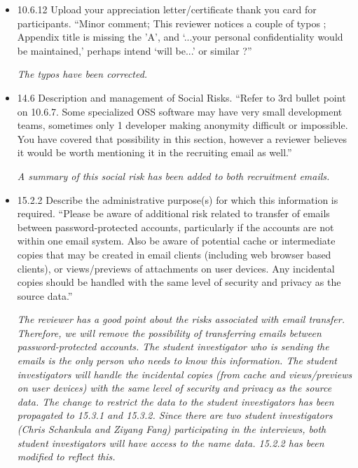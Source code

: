 \documentclass[12pt]{casletter}
\begin{document}
\begin{letter}
\begin{itemize}
\begin{itemize}
\emph{The statement about social risks has been added to both recruitment
emails.} \smallskip

\item Much like you have written in the oral consent script, please include a
statement like `I located your name/email by visiting the website of {research
software name}.' \smallskip

\emph{This statement has been added to both recruitment emails.} \smallskip

\end{itemize} \medskip

\item 10.6.12 Upload your appreciation letter/certificate thank you card for
participants.  ``Minor comment; This reviewer notices a couple of typos ;
Appendix title is missing the 'A', and `...your personal confidentiality would
be maintained,' perhaps intend `will be...' or similar ?'' \medskip

\emph{The typos have been corrected.} \smallskip

\item 14.6 Description and management of Social Risks.  ``Refer to 3rd bullet
point on 10.6.7. Some specialized OSS software may have very small development
teams, sometimes only 1 developer making anonymity difficult or impossible. You
have covered that possibility in this section, however a reviewer believes it
would be worth mentioning it in the recruiting email as well.'' \medskip

\emph{A summary of this social risk has been added to both recruitment emails.}
\smallskip

\item 15.2.2 Describe the administrative purpose(s) for which this information
is required.  ``Please be aware of additional risk related to transfer of emails
between password-protected accounts, particularly if the accounts are not
within one email system. Also be aware of potential cache or intermediate
copies that may be created in email clients (including web browser based
clients), or views/previews of attachments on user devices. Any incidental
copies should be handled with the same level of security and privacy as the
source data.'' \medskip

\emph{The reviewer has a good point about the risks associated with email
transfer.  Therefore, we will remove the possibility of transferring emails
between password-protected accounts.  The student investigator who is sending
the emails is the only person who needs to know this information. The student
investigators will handle the incidental copies (from cache and views/previews
on user devices) with the same level of security and privacy as the source data.
The change to restrict the data to the student investigators has been propagated
to 15.3.1 and 15.3.2. Since there are two student investigators (Chris Schankula
and Ziyang Fang) participating in the interviews, both student investigators
will have access to the name data.  15.2.2 has been modified to reflect this.}
\smallskip


\end{itemize}
\end{letter}
\end{document}
